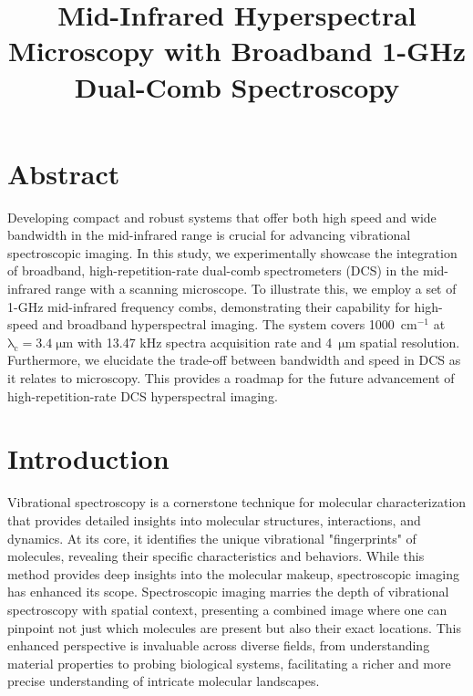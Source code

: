 \documentclass{optica-article}
\begin{document}
\title{Mid-Infrared Hyperspectral Microscopy with Broadband 1-GHz Dual-Comb Spectroscopy}

\section{Abstract}
Developing compact and robust systems that offer both high speed and wide bandwidth in the mid-infrared range is crucial for advancing vibrational spectroscopic imaging. In this study, we experimentally showcase the integration of broadband, high-repetition-rate dual-comb spectrometers (DCS) in the mid-infrared range with a scanning microscope. To illustrate this, we employ a set of 1-GHz mid-infrared frequency combs, demonstrating their capability for high-speed and broadband hyperspectral imaging. The system covers \mbox{1000 $\mathrm{cm^{-1}}$} at \mbox{$\mathrm{\lambda_c=3.4 \; \mu m}$} with 13.47 kHz spectra acquisition rate and \mbox{4 $\mathrm{\mu m}$} spatial resolution. Furthermore, we elucidate the trade-off between bandwidth and speed in DCS as it relates to microscopy. This provides a roadmap for the future advancement of high-repetition-rate DCS hyperspectral imaging.

\section{Introduction}
Vibrational spectroscopy is a cornerstone technique for molecular characterization that provides detailed insights into molecular structures, interactions, and dynamics. At its core, it identifies the unique vibrational "fingerprints" of molecules, revealing their specific characteristics and behaviors. While this method provides deep insights into the molecular makeup, spectroscopic imaging has enhanced its scope. Spectroscopic imaging marries the depth of vibrational spectroscopy with spatial context, presenting a combined image where one can pinpoint not just which molecules are present but also their exact locations. This enhanced perspective is invaluable across diverse fields, from understanding material properties to probing biological systems, facilitating a richer and more precise understanding of intricate molecular landscapes.
\end{document}
